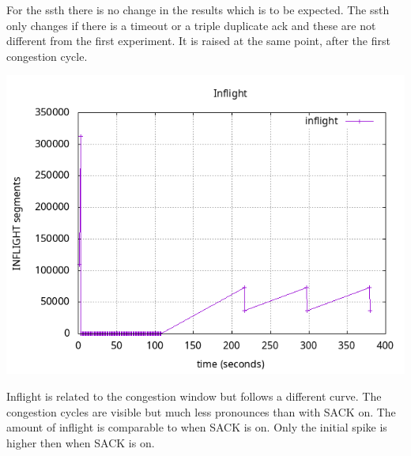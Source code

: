 \documentclass{article}
\begin{document}
For the ssth there is no change in the results which is to be expected. The ssth only changes if there is a timeout or a triple duplicate ack and these are not different from the first experiment. It is raised at the same point, after the first congestion cycle.

\includegraphics[scale=0.5]{plots/lab1-group5-task1-experimentA-question1.2.png}

Inflight is related to the congestion window but follows a different curve. The congestion cycles are visible but much less pronounces than with SACK on. The amount of inflight is comparable to when SACK is on. Only the initial spike is higher then when SACK is on.
\end{document}
